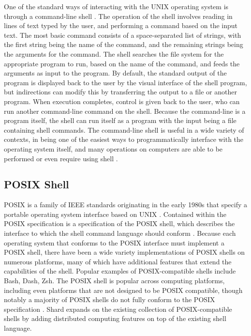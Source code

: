 \documentclass[twoside]{report}
\begin{document}
One of the standard ways of interacting with the UNIX operating system is through a command-line shell \cite{10.1145/361011.361061}.
The operation of the shell involves reading in lines of text typed by the user, and performing a command based on the input text.
The most basic command consists of a space-separated list of strings, with the first string being the name of the command, and the remaining strings being the arguments for the command.
The shell searches the file system for the appropriate program to run, based on the name of the command, and feeds the arguments as input to the program.
By default, the standard output of the program is displayed back to the user by the visual interface of the shell program, but indirections can modify this by transferring the output to a file or another program.
When execution completes, control is given back to the user, who can run another command-line command on the shell.
Because the command-line is a program itself, the shell can run itself as a program with the input being a file containing shell commands.
The command-line shell is useful in a wide variety of contexts, in being one of the easiest ways to programmatically interface with the operating system itself, and many operations on computers are able to be performed or even require using shell \cite{10.1145/3371111}.

\subsection{POSIX Shell}
POSIX is a family of IEEE standards originating in the early 1980s that specify a portable operating system interface based on UNIX \cite{10.1145/210308.210315}.
Contained within the POSIX specification is a specification of the POSIX shell, which describes the interface to which the shell command language should conform \cite{posix2017}.
Because each operating system that conforms to the POSIX interface must implement a POSIX shell, there have been a wide variety implementations of POSIX shells on numerous platforms, many of which have additional features that extend the capabilities of the shell.
Popular examples of POSIX-compatible shells include Bash, Dash, Zsh.
The POSIX shell is popular across computing platforms, including even platforms that are not designed to be POSIX compatible, though notably a majority of POSIX shells do not fully conform to the POSIX specification \cite{10.1145/3371111}.
Shard expands on the existing collection of POSIX-compatible shells by adding distributed computing features on top of the existing shell language.
\end{document}
